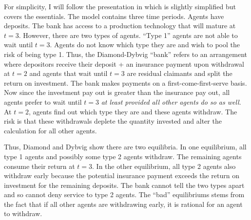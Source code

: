 \documentclass[12pt]{article}
\begin{document}
\begin{doublespace}
For simplicity, I will follow the presentation in \citet{white1999theory} which is slightly simplified but covers the essentials.
The model contains three time periods. Agents have deposits. The bank has access to a production technology that will mature at $t=3$. However, there are two
types of agents. ``Type 1'' agents are not able to wait until $t=3$. Agents do not know which type they are and wish to pool the risk of being type 1. Thus, the
Diamond-Dybvig ``bank'' refers to an arrangement where depositors receive their deposit + an insurance payment upon withdrawal at $t=2$ and agents that wait until
$t=3$ are residual claimants and split the return on investment. The bank makes payments on a first-come-first-serve basis. Now since the investment pay out is greater than the insurance pay out, all agents prefer to wait until $t=3$ \emph{at least provided all other agents do so as well}. At $t=2$, agents find out which type they are and these agents withdraw. The risk is that these withdrawals deplete the quantity invested and alter the calculation for all other agents.

Thus, Diamond and Dybvig show there are two equilibria. In one equilibrium, all type 1 agents and possibly some type 2 agents withdraw. The remaining agents consume their return at $t=3$. In the other equilibrium, all type 2 agents also withdraw early because the potential insurance payment exceeds the return on investment for the remaining deposits. The bank cannot tell the two types apart and so cannot deny service to type 2 agents. The ``bad'' equilibriums stems from the fact that if all other agents are withdrawing early,
it is rational for an agent to withdraw.


\end{doublespace}
\end{document}
